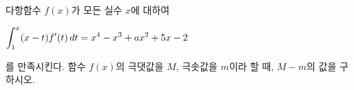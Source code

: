 다항함수 $f(x)$가 모든 실수 $x$에 대하여 \par\smallskip\noindent\hspace*{1.5em}$\displaystyle\int_{1}^{x}(x-t)f'(t)\mkern3mu dt=x^4-x^3+ax^2+5x-2$\par\smallskip\noindent 를 만족시킨다. 함수 $f(x)$의 극댓값을 $M$, 극솟값을 $m$이라 할 때, $M-m$의 값을 구하시오. 
